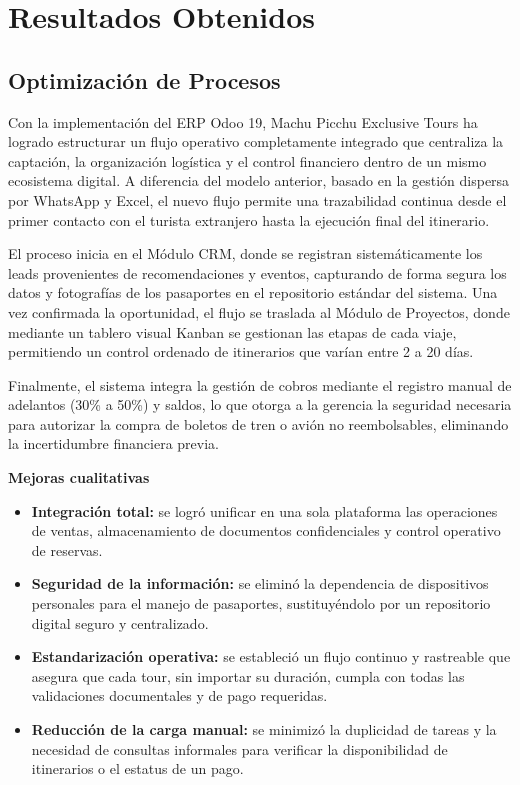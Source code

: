 \section{Resultados Obtenidos}

\subsection{Optimización de Procesos}

Con la implementación del ERP Odoo 19, Machu Picchu Exclusive Tours ha logrado estructurar
un flujo operativo completamente integrado que centraliza la captación, la organización
logística y el control financiero dentro de un mismo ecosistema digital. A diferencia del
modelo anterior, basado en la gestión dispersa por WhatsApp y Excel, el nuevo flujo permite
una trazabilidad continua desde el primer contacto con el turista extranjero hasta la
ejecución final del itinerario.

El proceso inicia en el Módulo CRM, donde se registran sistemáticamente los leads
provenientes de recomendaciones y eventos, capturando de forma segura los datos y
fotografías de los pasaportes en el repositorio estándar del sistema. Una vez confirmada la
oportunidad, el flujo se traslada al Módulo de Proyectos, donde mediante un tablero visual
Kanban se gestionan las etapas de cada viaje, permitiendo un control ordenado de itinerarios
que varían entre 2 a 20 días.

Finalmente, el sistema integra la gestión de cobros mediante el registro manual de adelantos
(30\% a 50\%) y saldos, lo que otorga a la gerencia la seguridad necesaria para autorizar la
compra de boletos de tren o avión no reembolsables, eliminando la incertidumbre financiera
previa.

\textbf{Mejoras cualitativas}
\begin{itemize}
    \item \textbf{Integración total:} se logró unificar en una sola plataforma las operaciones de ventas, almacenamiento de documentos confidenciales y control operativo de reservas.
    \item \textbf{Seguridad de la información:} se eliminó la dependencia de dispositivos personales para el manejo de pasaportes, sustituyéndolo por un repositorio digital seguro y centralizado.
    \item \textbf{Estandarización operativa:} se estableció un flujo continuo y rastreable que asegura que cada tour, sin importar su duración, cumpla con todas las validaciones documentales y de pago requeridas.
    \item \textbf{Reducción de la carga manual:} se minimizó la duplicidad de tareas y la necesidad de consultas informales para verificar la disponibilidad de itinerarios o el estatus de un pago.
\end{itemize}

